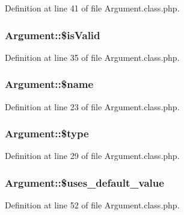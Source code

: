 Definition at line 41 of file Argument.\-class.\-php.

\hypertarget{classArgument_af1a5d4055fd3e16bea7951843a3bdd92}{
\subsubsection[{\$is\-Valid}]{\setlength{\rightskip}{0pt plus 5cm}Argument\-::\$is\-Valid}}\label{classArgument_af1a5d4055fd3e16bea7951843a3bdd92}


Definition at line 35 of file Argument.\-class.\-php.

\hypertarget{classArgument_ab37a45cb92464255505b2f4f35909da6}{
\subsubsection[{\$name}]{\setlength{\rightskip}{0pt plus 5cm}Argument\-::\$name}}\label{classArgument_ab37a45cb92464255505b2f4f35909da6}


Definition at line 23 of file Argument.\-class.\-php.

\hypertarget{classArgument_a7a2272bc3d12787f80143fbea01698f4}{
\subsubsection[{\$type}]{\setlength{\rightskip}{0pt plus 5cm}Argument\-::\$type}}\label{classArgument_a7a2272bc3d12787f80143fbea01698f4}


Definition at line 29 of file Argument.\-class.\-php.

\hypertarget{classArgument_a3f8f20477043da002ba9d48ede482baf}{
\subsubsection[{\$uses\-\_\-default\-\_\-value}]{\setlength{\rightskip}{0pt plus 5cm}Argument\-::\$uses\-\_\-default\-\_\-value}}\label{classArgument_a3f8f20477043da002ba9d48ede482baf}


Definition at line 52 of file Argument.\-class.\-php.

